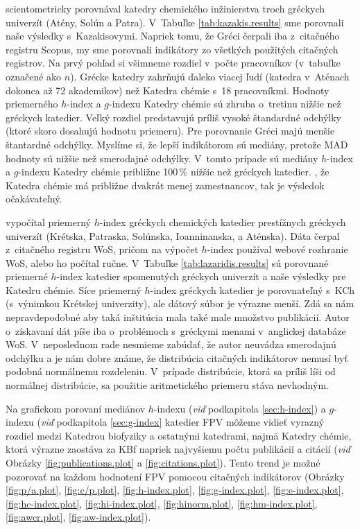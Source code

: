 \citet{Kazakis2015} scientometricky porovnával katedry chemického inžinierstva
troch gréckych univerzít (Atény, Solún a Patra).  V~Tabuľke
\ref{tab:kazakis.results} sme porovnali naše výsledky s~Kazakisovymi. Napriek
tomu, že Gréci čerpali iba z~citačného registru Scopus, my sme porovnali
indikátory zo všetkých použitých citačných registrov. Na prvý pohľad si všimneme
rozdiel v~počte pracovníkov (v~tabuľke označené ako $n$).  Grécke katedry
zahrňujú ďaleko viacej ľudí (katedra v~Aténach dokonca až 72 akademikov) než
Katedra chémie s~18 pracovníkmi.  Hodnoty priemerného $h$-index a $g$-indexu
Katedry chémie sú zhruba o~tretinu nižšie než gréckych katedier.  Veľký rozdiel
predstavujú príliš vysoké štandardné odchýlky (ktoré skoro dosahujú hodnotu
priemeru). Pre porovnanie Gréci majú menšie štantardné odchýlky.  Myslíme si, že
lepší indikátorom sú mediány, pretože MAD hodnoty sú nižšie než smerodajné
odchýlky.  V~tomto prípade sú mediány $h$-index a $g$-indexu Katedry chémie
približne 100\,\% nižšie než gréckych katedier. , že Katedra chémie má približne
dvakrát menej zamestnancov, tak je výsledok očakávateľný.

\citet{Lazaridis2010} vypočítal priemerný $h$-index gréckych chemických katedier
prestížnych gréckych univerzít (Krétska, Patraska, Solúnska, Ioanninanska, a
Aténska).  Dáta čerpal z~citačného registru WoS, pričom na výpočet $h$-index
používal webové rozhranie WoS, alebo ho počítal ručne.  V~Tabuľke
\ref{tab:lazaridis.results} sú porovnané priemerné $h$-index katedier spomenutých
gréckych univerzít a naše výsledky pre Katedru chémie. Síce priemerný $h$-index
gréckych katedier je porovnateľný s~KCh (s~výnimkou Krétskej univerzity), ale
dátový súbor je výrazne menší. Zdá sa nám nepravdepodobné aby taká inštitúcia
mala také male množstvo publikácií.  Autor o~získavaní dát píše iba o~problémoch
s~gréckymi menami v~anglickej databáze WoS. V~neposlednom rade nesmieme zabúdať,
že autor neuvádza smerodajnú odchýlku a je nám dobre známe, že distribúcia
citačných indikátorov nemusí byť podobná normálnemu rozdeleniu. V~prípade
distribúcie, ktorá sa príliš líši od normálnej distribúcie, sa použitie
aritmetického priemeru stáva nevhodným.

Na grafickom porovaní mediánov $h$-indexu (\emph{viď} podkapitola
\ref{sec:h-index}) a $g$-indexu (\emph{viď} podkapitola \ref{sec:g-index}
katedier FPV môžeme vidieť vyrazný rozdiel medzi Katedrou biofyziky a ostatnými
katedrami, najmä Katedry chémie, ktorá výrazne zaostáva za KBf napriek
najvyšiemu počtu publikácií a citácií (\emph{viď} Obrázky
\ref{fig:publications.plot} a \ref{fig:citations.plot}).  Tento trend je možné
pozorovať na každom hodnotení FPV pomocou citačných indikátorov (Obrázky
\ref{fig:p/a.plot}, \ref{fig:c/p.plot}, \ref{fig:h-index.plot},
\ref{fig:g-index.plot}, \ref{fig:e-index.plot}, \ref{fig:hc-index.plot},
\ref{fig:hi-index.plot}, \ref{fig:hinorm.plot}, \ref{fig:hm-index.plot},
\ref{fig:awcr.plot}, \ref{fig:aw-index.plot}).

